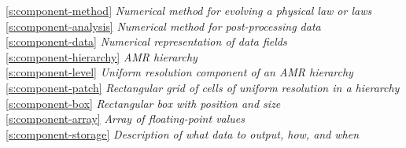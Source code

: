 \begin{tabbing}
\ref{s:component-method}  \>\>            \>\>\> \textit{Numerical method for evolving a physical law or laws} \\
\ref{s:component-analysis}  \>\>          \>\>\> \textit{Numerical method for post-processing data} \\
\ref{s:component-data}  \>\>              \>\>\> \textit{Numerical representation of data fields} \\
\ref{s:component-hierarchy}  \>\>\>         \>\> \textit{AMR hierarchy} \\
\ref{s:component-level}  \>\>\>             \>\> \textit{Uniform resolution component of an AMR hierarchy} \\
\ref{s:component-patch}  \>\>\>             \>\> \textit{Rectangular grid of cells of uniform resolution in a hierarchy} \\
\ref{s:component-box}  \>\>\>\>               \> \textit{Rectangular box with position and size} \\
\ref{s:component-array}  \>\>\>\>             \> \textit{Array of floating-point values} \\
\ref{s:component-storage}  \>\>            \>\>\> \textit{Description of what data to output, how, and when}
\end{tabbing}




















